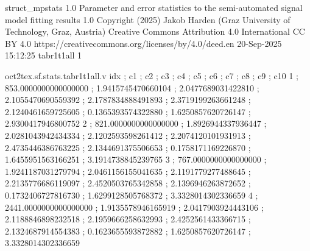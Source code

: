 \expandafter\def\csname oct2tex.sf.stats.obj\endcsname{struct\_mpstats}
\expandafter\def\csname oct2tex.sf.stats.ver\endcsname{1.0}
\expandafter\def\csname oct2tex.sf.stats.des\endcsname{Parameter and error statistics to the semi-automated signal model fitting results}
\expandafter\def\csname oct2tex.sf.stats.algover\endcsname{1.0}
\expandafter\def\csname oct2tex.sf.stats.cpr\endcsname{Copyright (2025) Jakob Harden (Graz University of Technology, Graz, Austria)}
\expandafter\def\csname oct2tex.sf.stats.liclong\endcsname{Creative Commons Attribution 4.0 International}
\expandafter\def\csname oct2tex.sf.stats.licshort\endcsname{CC BY 4.0}
\expandafter\def\csname oct2tex.sf.stats.licurl\endcsname{https://creativecommons.org/licenses/by/4.0/deed.en}
\expandafter\def\csname oct2tex.sf.stats.created\endcsname{20-Sep-2025 15:12:25}
\expandafter\def\csname oct2tex.sf.stats.tabr1t1all.t\endcsname{tabr1t1all}
\expandafter\def\csname oct2tex.sf.stats.tabr1t1all.u\endcsname{1}
\begin{filecontents}[overwrite]{oct2tex.sf.stats.tabr1t1all.v}
idx ; c1 ; c2 ; c3 ; c4 ; c5 ; c6 ; c7 ; c8 ; c9 ; c10
1 ; 853.0000000000000000 ; 1.9415745470660104 ; 2.0477689031422810 ; 2.1055470690559392 ; 2.1787834888491893 ; 2.3719199263661248 ; 2.1240461659725605 ; 0.1365393574322880 ; 1.6250857620726147 ; 2.9300417946800752
2 ; 821.0000000000000000 ; 1.8926944337936447 ; 2.0281043942434334 ; 2.1202593598261412 ; 2.2074120101931913 ; 2.4735446386763225 ; 2.1344691375506653 ; 0.1758171169226870 ; 1.6455951563166251 ; 3.1914738845239765
3 ; 767.0000000000000000 ; 1.9241187031279794 ; 2.0461156155041635 ; 2.1191779277488645 ; 2.2135776686119097 ; 2.4520503765342858 ; 2.1396946263872652 ; 0.1732406727816730 ; 1.6299128505768372 ; 3.3328014302336659
4 ; 2441.0000000000000000 ; 1.9135578946165919 ; 2.0417903924443106 ; 2.1188846898232518 ; 2.1959666258632993 ; 2.4252561433366715 ; 2.1324687914554383 ; 0.1623655593872882 ; 1.6250857620726147 ; 3.3328014302336659
\end{filecontents}
